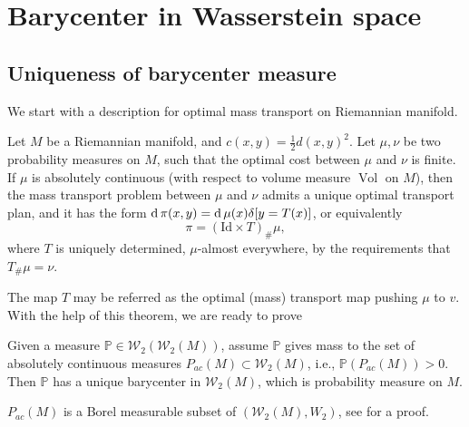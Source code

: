 \section{Barycenter in Wasserstein space}
\subsection{Uniqueness of barycenter measure}

We start with a description \cite[Theorem 10.41]{villani2008optimal}
for optimal mass transport on Riemannian manifold.
\begin{thm}
	\label{thm:uniquness_monge_problem_manifold}
	Let \( M \) be a Riemannian manifold, and \( c ( x , y ) = \frac{1}{2} d ( x , y ) ^ { 2 } \).
	Let \( \mu , \nu \) be two probability measures on \( M \), such that the optimal cost
	between \( \mu \) and \( \nu \) is finite.
	If \( \mu \) is absolutely continuous (with respect to volume measure $\operatorname{Vol}$ on $M$),
	then the mass transport
	problem between \( \mu \) and \( \nu \) admits a unique optimal transport plan, and it
	has the form \( \operatorname{d} \pi ( x , y ) = \operatorname{d} \mu ( x ) \delta [ y = T ( x ) ] \),
	or equivalently \[ \pi = ( \mathrm { Id } \times T )_{\#} \mu , \]
	where \( T \) is uniquely determined, \( \mu \)-almost everywhere,
	by the requirements that \( T_{\#} \mu = \nu \).
\end{thm}

The map \( T \) may be referred as
the optimal (mass) transport map pushing \( \mu \) to \( v \).
With the help of this theorem, we are ready to prove
\begin{prop}
	\label{prop:uniquness_barycenter_Wasserstein}
	Given a measure $\mathbb{P} \in \mathcal{W}_2(\mathcal{W}_2(M))$,
	assume $\mathbb{P}$ gives mass to the set of absolutely continuous measures $P_{ac}(M) \subset \mathcal{W}_2(M)$,
	i.e.,	$\mathbb{P}(P_{ac}(M)) > 0 $.
	Then $\mathbb{P}$ has a unique barycenter in $\mathcal{W}_2(M)$, which is probability measure on $M$.
\end{prop}

\begin{rmk}
	$P_{ac}(M)$ is a Borel measurable subset of $(\mathcal{W}_2(M), W_2)$,
	see \cite[Proposition 2.1]{KIM2017640} for a proof.
\end{rmk}

